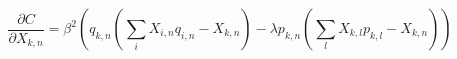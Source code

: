 \begin{equation} \label{costgrad}
    \frac{\partial C}{\partial X_{k,n}} = \beta^{2} \left( q_{k,n} \left(\sum_{i}X_{i,n}q_{i,n} - X_{k,n}\right) - \lambda p_{k,n} \left( \sum_{l}X_{k,l}p_{k,l} - X_{k,n}\right)\right)
\end{equation}



